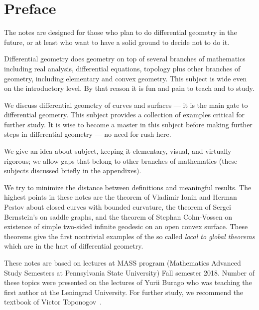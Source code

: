 
\chapter*{Preface}

The notes are designed for those who plan to do differential geometry in the future,
or at least who want to have a solid ground to decide not to do it.

Differential geometry does geometry on top of several branches of mathematics including real analysis, differential equations, topology plus other branches of geometry, including elementary and convex geometry.
This subject is wide even on the introductory level. 
By that reason it is fun and pain to teach and to study.

We discuss differential geometry of curves and surfaces --- it is the main gate to differential geometry.
This subject provides a collection of examples critical for further study.
It is wise to become a master in this subject before making further steps in differential geometry --- no need for rush here.

We give an idea about subject, keeping it elementary, visual, and virtually rigorous; we allow gaps that belong to other branches of mathematics (these subjects discussed briefly in the appendixes).

We try to minimize the distance between definitions and meaningful results.
The highest points in these notes are
the theorem of Vladimir Ionin and Herman Pestov about closed curves with bounded curvature,
the theorem of Sergei Bernstein's on saddle graphs,
and the theorem of Stephan Cohn-Vossen on existence of simple two-sided infinite geodesic on an open convex surface.
These theorems give the first nontrivial examples of the so called \emph{local to global theorems} which are in the hart of differential geometry. 

These notes are based on lectures at MASS program (Mathematics Advanced Study Semesters at Pennsylvania State University) Fall semester 2018.
Number of these topics were presented on the lectures of Yurii Burago who was teaching the first author at the Leningrad University.
For further study, we recommend the textbook of Victor Toponogov~\cite{toponogov}.
